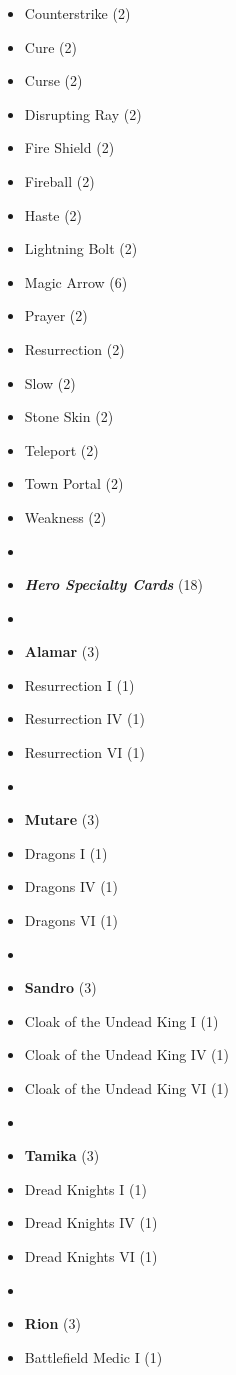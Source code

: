 \begin{multicols*}{3}
\begin{itemize}[leftmargin=0pt, label={}, noitemsep]
  \item Counterstrike (2)
  \item Cure (2)
  \item Curse (2)
  \item Disrupting Ray (2)
  \item Fire Shield (2)
  \item Fireball (2)
  \item Haste (2)
  \item Lightning Bolt (2)
  \item Magic Arrow (6)
  \item Prayer (2)
  \item Resurrection (2)
  \item Slow (2)
  \item Stone Skin (2)
  \item Teleport (2)
  \item Town Portal (2)
  \item Weakness (2)
  \item
  \item \textbf{\emph{Hero Specialty Cards}} (18)
  \item
  \item \textbf{Alamar} (3)
  \item Resurrection I (1)
  \item Resurrection IV (1)
  \item Resurrection VI (1)
  \item
  \item \textbf{Mutare} (3)
  \item Dragons I (1)
  \item Dragons IV (1)
  \item Dragons VI (1)
  \item
  \item \textbf{Sandro} (3)
  \item Cloak of the Undead King I (1)
  \item Cloak of the Undead King IV (1)
  \item Cloak of the Undead King VI (1)
  \item
  \item \textbf{Tamika} (3)
  \item Dread Knights I (1)
  \item Dread Knights IV (1)
  \item Dread Knights VI (1)
  \item
  \item \textbf{Rion} (3)
  \item Battlefield Medic I (1)

\end{itemize}
\end{multicols*}
